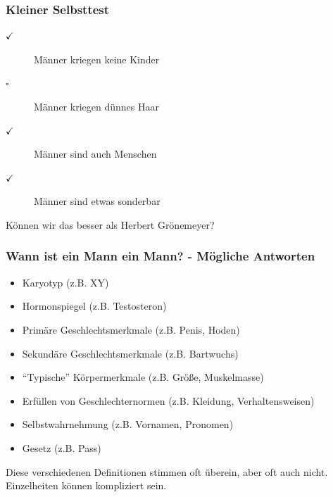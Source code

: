 \documentclass{beamer}
\begin{document}
\begin{frame}

\frametitle{Kleiner Selbsttest}


\begin{description}
\item[$\checkmark$]
 Männer kriegen keine Kinder
\item[$\square$]
Männer kriegen dünnes Haar
\item[$\checkmark$]
 Männer sind auch Menschen
\item[$\checkmark$]
 Männer sind etwas sonderbar \\[1cm]
\end{description}

 

Können wir das besser als Herbert Grönemeyer?

\end{frame}



\begin{frame}
\frametitle{Wann ist ein Mann ein Mann? - Mögliche Antworten}
 

\begin{itemize}
\item
Karyotyp (z.B. XY)
\item
Hormonspiegel (z.B. Testosteron)
\item
Primäre Geschlechtsmerkmale (z.B. Penis, Hoden)
\item
Sekundäre Geschlechtsmerkmale (z.B. Bartwuchs)
\item
``Typische'' Körpermerkmale (z.B. Größe, Muskelmasse)
\item
Erfüllen von Geschlechternormen (z.B. Kleidung, Verhaltensweisen)
\item
Selbstwahrnehmung (z.B. Vornamen, Pronomen)
\item
Gesetz (z.B.  Pass)
\end{itemize}

 

Diese verschiedenen Definitionen stimmen oft überein, aber oft auch nicht. Einzelheiten können kompliziert sein.

\end{frame}
\end{document}
